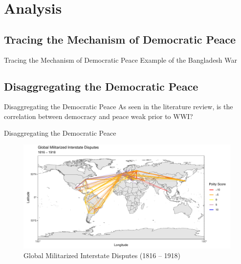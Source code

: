 \documentclass{beamer}
\begin{document}
	\section{Analysis}
	
	\subsection{Tracing the Mechanism of Democratic Peace}
	
	\begin{frame}{Tracing the Mechanism of Democratic Peace}
		\centering\Large Example of the Bangladesh War
	\end{frame}
	
	\subsection{Disaggregating the Democratic Peace}
	
	\begin{frame}{Disaggregating the Democratic Peace}
		\centering\large As seen in the literature review, is the correlation between democracy and peace weak prior to WWI?
	\end{frame}
	
	\begin{frame}{Disaggregating the Democratic Peace}
	\begin{figure}
		\includegraphics[width=\linewidth]{data/output/plots/preww1.pdf}
		\caption{Global Militarized Interstate Disputes (1816 -- 1918)}
	\end{figure}
	\end{frame}
\end{document}
